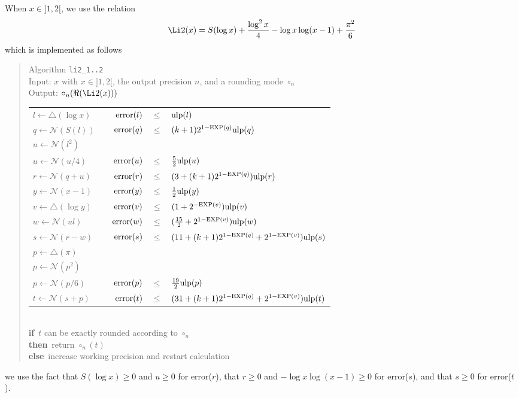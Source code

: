 \documentclass[12pt]{amsart}
\def\n{\textnormal}
\def\pinf{\bigtriangleup}
\def\ulp{{\rm ulp}}
\def\Exp{{\rm EXP}}
\def\N{{\mathcal N}}
\def\If{{\bf if}}
\def\then{{\bf then}}
\def\Else{{\bf else}}
\begin{document}
When $x \in ]1, 2[$, we use the relation
\[
\Li2(x) = S(\log x) + \frac{\log^2 x}{4} - \log x \log(x - 1) + \frac{\pi^2}{6}
\]
which is implemented as follows
\begin{quote}
Algorithm {\tt li2\_1..2}\\
Input: $x$ with $x \in ]1, 2[$, the output precision $n$, and a rounding mode
    $\circ_n$ \\
Output: $\circ_n(\Re(\Li2(x)))$ \\
\begin{tabular}{l c r c l}
$l \leftarrow \pinf(\log x)$ & & $\n{error}(l) $ & $ \leq $ & $ \ulp(l)$\\
$q \leftarrow \N(S(l))$ & &
$\n{error}(q) $ & $ \leq $ & $ (k+1)2^{1-\Exp(q)} \ulp(q)$\\

$u \leftarrow \N(l^2)$\\
$u \leftarrow \N(u/4)$ & &
$\n{error}(u) $ & $ \leq $ & $ \frac{5}{2} \ulp(u)$\\
$r \leftarrow \N(q + u)$ & &
$\n{error}(r) $ & $ \leq $ & $ (3+(k+1)2^{1-\Exp(q)})\ulp(r)$\\

$y \leftarrow \N(x - 1)$ & &
$\n{error}(y) $ & $ \leq $ & $ \frac{1}{2}\ulp(y)$ \\
$v \leftarrow \pinf(\log y)$ & &
$\n{error}(v) $ & $ \leq $ & $(1 + 2^{-\Exp(v)}) \ulp(v)$\\
$w \leftarrow \N(ul)$ & &
$\n{error}(w) $ & $ \leq $ & $(\frac{15}{2} + 2^{1-\Exp(v)}) \ulp(w)$\\
$s \leftarrow \N(r - w)$ & &
$\n{error}(s) $ & $ \leq $ &
$ (11 + (k+1) 2^{1-\Exp(q)} + 2^{1-\Exp(v)})\ulp(s)$ \\

$p \leftarrow \pinf(\pi)$ \\
$p \leftarrow \N(p^2)$ \\
$p \leftarrow \N(p/6)$ & &
$\n{error}(p) $ & $ \leq $ & $ \frac{19}{2}\ulp(p)$\\
$t \leftarrow \N(s + p)$ & &
$\n{error}(t) $ & $ \leq $ &
$ (31 + (k+1) 2^{1-\Exp(q)} + 2^{1-\Exp(v)}) \ulp(t)$
\end{tabular}\\
\If\ $t$ can be exactly rounded according to $\circ_n$\\
\then\ return $\circ_n(t)$\\
\Else\ increase working precision and restart calculation
\end{quote}

we use the fact that $S(\log x) \geq 0$ and $u \geq 0$ for error($r$),
that $r \geq 0$ and $-\log x \log(x-1) \geq 0$ for error($s$),
and that $s \geq 0$ for error($t$).
\end{document}
